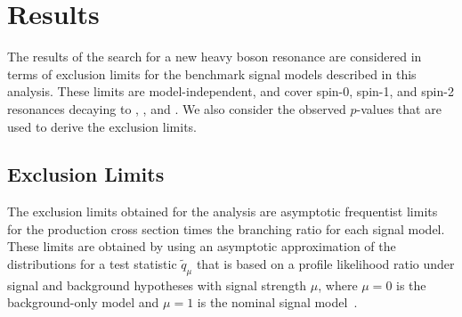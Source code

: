 
\section{Results}
\label{sec:results}

The results of the search for a new heavy boson resonance are considered in terms of exclusion limits for the benchmark signal models described in this analysis.
These limits are model-independent, and cover spin-0, spin-1, and spin-2 resonances decaying to \WW, \WZ, and \WH.
We also consider the observed $p$-values that are used to derive the exclusion limits.

\subsection{Exclusion Limits}

The exclusion limits obtained for the analysis are asymptotic frequentist limits for the production cross section times the branching ratio for each signal model.
These limits are obtained by using an asymptotic approximation of the distributions for a test statistic $\tilde{q}_\mu$ that is based on a profile likelihood ratio under signal and background hypotheses with signal strength $\mu$, where $\mu=0$ is the background-only model and $\mu=1$ is the nominal signal model~\cite{Cowan_2011}.

